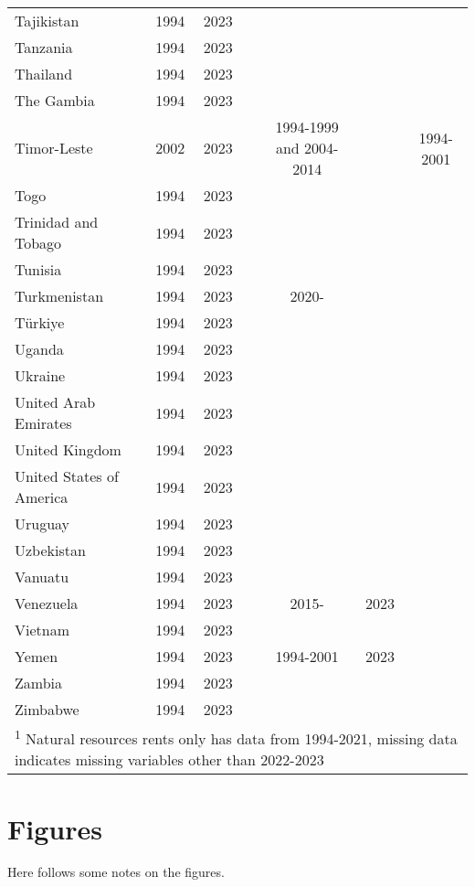 {\begin{longtable}{lcccccc}
Tajikistan & 1994 & 2023 &  &  &  & \\
Tanzania & 1994 & 2023 &  &  &  & \\
Thailand & 1994 & 2023 &  &  &  & \\
The Gambia & 1994 & 2023 &  &  &  & \\
\addlinespace
Timor-Leste & 2002 & 2023 &  & 1994-1999 and 2004-2014 &  & 1994-2001\\
Togo & 1994 & 2023 &  &  &  & \\
Trinidad and Tobago & 1994 & 2023 &  &  &  & \\
Tunisia & 1994 & 2023 &  &  &  & \\
Turkmenistan & 1994 & 2023 &  & 2020- &  & \\
\addlinespace
Türkiye & 1994 & 2023 &  &  &  & \\
Uganda & 1994 & 2023 &  &  &  & \\
Ukraine & 1994 & 2023 &  &  &  & \\
United Arab Emirates & 1994 & 2023 &  &  &  & \\
United Kingdom & 1994 & 2023 &  &  &  & \\
\addlinespace
United States of America & 1994 & 2023 &  &  &  & \\
Uruguay & 1994 & 2023 &  &  &  & \\
Uzbekistan & 1994 & 2023 &  &  &  & \\
Vanuatu & 1994 & 2023 &  &  &  & \\
Venezuela & 1994 & 2023 &  & 2015- & 2023 & \\
\addlinespace
Vietnam & 1994 & 2023 &  &  &  & \\
Yemen & 1994 & 2023 &  & 1994-2001 & 2023 & \\
Zambia & 1994 & 2023 &  &  &  & \\
Zimbabwe & 1994 & 2023 &  &  &  & \\
\bottomrule
\multicolumn{7}{l}{\rule{0pt}{1em}\textsuperscript{1} Natural resources rents only has data from 1994-2021, missing data indicates missing variables other than 2022-2023}\\
\end{longtable}
}

\section{Figures}
Here follows some notes on the figures.


